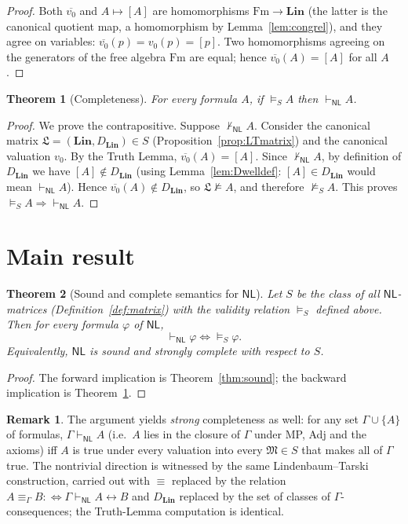 \documentclass[12pt]{article}
\newtheorem{theorem}{Theorem}
\theoremstyle{definition}
\newtheorem{remark}{Remark}
\newcommand{\NL}{\mathsf{NL}}
\newcommand{\prv}{\vdash_{\NL}}
\newcommand{\vld}{\vDash}
\newcommand{\Fm}{\mathrm{Fm}}
\newcommand{\bic}{\leftrightarrow}
\newcommand{\Lin}{\mathbf{Lin}}
\begin{document}
\begin{proof}
Both $\overline{v_{0}}$ and $A\mapsto[A]$ are homomorphisms $\Fm\to\Lin$
(the latter is the canonical quotient map, a homomorphism by
Lemma~\ref{lem:congrel}), and they agree on variables:
$\overline{v_{0}}(p)=v_{0}(p)=[p]$. Two homomorphisms agreeing on the
generators of the free algebra $\Fm$ are equal; hence
$\overline{v_{0}}(A)=[A]$ for all $A$.
\end{proof}

\begin{theorem}[Completeness]\label{thm:complete}
For every formula $A$, if $\vld_{S}A$ then $\prv A$.
\end{theorem}

\begin{proof}
We prove the contrapositive. Suppose $\not\prv A$. Consider the canonical
matrix $\mathfrak L=(\Lin,D_{\Lin})\in S$ (Proposition~\ref{prop:LTmatrix}) and
the canonical valuation $v_{0}$. By the Truth Lemma,
$\overline{v_{0}}(A)=[A]$. Since $\not\prv A$, by definition of $D_{\Lin}$ we
have $[A]\notin D_{\Lin}$ (using Lemma~\ref{lem:Dwelldef}: $[A]\in D_{\Lin}$
would mean $\prv A$). Hence $\overline{v_{0}}(A)\notin D_{\Lin}$, so
$\mathfrak L\not\vld A$, and therefore $\not\vld_{S}A$. This proves
$\vld_{S}A\Rightarrow\prv A$.
\end{proof}

\section{Main result}

\begin{theorem}[Sound and complete semantics for $\NL$]\label{thm:main}
Let $S$ be the class of all $\NL$-matrices (Definition~\ref{def:matrix}) with the
validity relation $\vld_{S}$ defined above. Then for every formula $\varphi$ of
$\NL$,
\[
\prv\varphi \iff \vld_{S}\varphi .
\]
Equivalently, $\NL$ is sound and strongly complete with respect to $S$.
\end{theorem}

\begin{proof}
The forward implication is Theorem~\ref{thm:sound}; the backward implication is
Theorem~\ref{thm:complete}.
\end{proof}

\begin{remark}\label{rem:strongcompl}
The argument yields \emph{strong} completeness as well: for any set
$\Gamma\cup\{A\}$ of formulas, $\Gamma\prv A$ (i.e.\ $A$ lies in the closure of
$\Gamma$ under MP, Adj and the axioms) iff $A$ is true under every valuation into
every $\mathfrak M\in S$ that makes all of $\Gamma$ true. The nontrivial
direction is witnessed by the same Lindenbaum--Tarski construction, carried out
with $\equiv$ replaced by the relation $A\equiv_\Gamma B:\Leftrightarrow
\Gamma\prv A\bic B$ and $D_{\Lin}$ replaced by the set of classes of
$\Gamma$-consequences; the Truth-Lemma computation is identical.
\end{remark}
\end{document}
